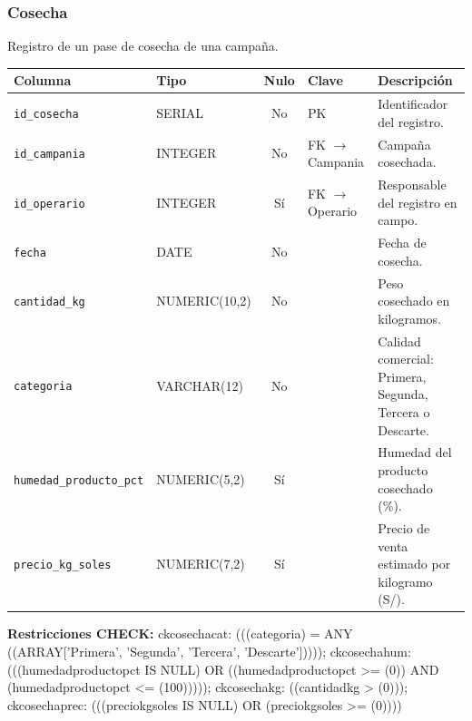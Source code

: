 \documentclass[11pt,letterpaper]{article}
\newcommand{\tbus}{\textunderscore\allowbreak}
\newcommand{\tb}[1]{{\ttfamily\let\_\tbus #1}}
\begin{document}
\subsubsection*{Cosecha}
Registro de un pase de cosecha de una campaña.
{\footnotesize
\begin{longtable}{>{\raggedright\arraybackslash}p{3.3cm}>{\raggedright\arraybackslash}p{2.5cm}c>{\raggedright\arraybackslash}p{2.2cm}>{\raggedright\arraybackslash}p{6.1cm}}
\toprule
\textbf{Columna} & \textbf{Tipo} & \textbf{Nulo} & \textbf{Clave} & \textbf{Descripción} \\
\midrule
\endhead
\texttt{id\_cosecha} & SERIAL & No & PK & Identificador del registro. \\
\texttt{id\_campania} & INTEGER & No & FK $\to$ Campania & Campaña cosechada. \\
\texttt{id\_operario} & INTEGER & Sí & FK $\to$ Operario & Responsable del registro en campo. \\
\texttt{fecha} & DATE & No &  & Fecha de cosecha. \\
\texttt{cantidad\_kg} & NUMERIC(10,2) & No &  & Peso cosechado en kilogramos. \\
\texttt{categoria} & VARCHAR(12) & No &  & Calidad comercial: Primera, Segunda, Tercera o Descarte. \\
\texttt{humedad\_producto\_pct} & NUMERIC(5,2) & Sí &  & Humedad del producto cosechado (\%). \\
\texttt{precio\_kg\_soles} & NUMERIC(7,2) & Sí &  & Precio de venta estimado por kilogramo (S/). \\
\bottomrule
\end{longtable}}
{\footnotesize\textbf{Restricciones CHECK:} \tb{ck\_cosecha\_cat}: \tb{(((categoria) = ANY ((ARRAY['Primera', 'Segunda', 'Tercera', 'Descarte']))))}; \tb{ck\_cosecha\_hum}: \tb{(((humedad\_producto\_pct IS NULL) OR ((humedad\_producto\_pct >= (0)) AND (humedad\_producto\_pct <= (100)))))}; \tb{ck\_cosecha\_kg}: \tb{((cantidad\_kg > (0)))}; \tb{ck\_cosecha\_prec}: \tb{(((precio\_kg\_soles IS NULL) OR (precio\_kg\_soles >= (0))))}\par}
\medskip
\end{document}
